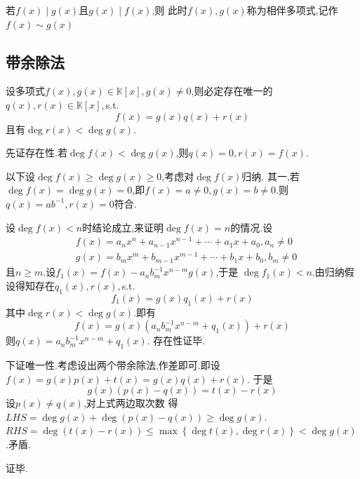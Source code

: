 \begin{formal}
\begin{definition}[相伴多项式]\label{def:相伴多项式}
    若$f\left(x\right)\mid g\left(x\right)$且$g\left(x\right)\mid f\left(x\right)$,则
        此时$f\left(x\right),g\left(x\right)$称为相伴多项式,记作$f\left(x\right)\sim 
        g\left(x\right)$
\end{definition}
\end{formal}
\subsection{带余除法}
\begin{formal}
\begin{theorem}[带余除法]\label{thm:带余除法}
    设多项式$f\left(x\right),g\left(x\right)\in \mathbb{K}\left[x\right],
    g\left(x\right)\neq 0$,则必定存在唯一的$q\left(x\right),r\left(x\right)\in \mathbb{K}\left[x\right]$,\,\textup{s.t.}
    \[
    f\left(x\right)=g\left(x\right)q\left(x\right)+r\left(x\right)
    \]
    且有$\deg r\left(x\right)<\deg g\left(x\right)$.
\end{theorem}
\begin{Proof}
先证存在性.若$\deg f\left(x\right)<\deg g\left(x\right)$,则$q\left(x\right)=0,r\left(x\right)=f\left(x\right)$.

以下设$\deg f\left(x\right)\geqslant \deg g\left(x\right)\geqslant 0$,考虑对$\deg f\left(x\right)$归纳.
其一,若$\deg f\left(x\right)=\deg g\left(x\right)=0$,即$f\left(x\right)=a\neq 0,g\left(x\right)=b\neq 0$.则$q\left(x\right)=ab^{-1},r\left(x\right)=0$符合.

设$\deg f\left(x\right)<n$时结论成立,来证明$\deg f\left(x\right)=n$的情况.设\begin{align*}
    &f\left(x\right)=a_nx^n+a_{n-1}x^{n-1}+\cdots+a_1x+a_0,a_n\neq 0\\
    &g\left(x\right)=b_mx^m+b_{m-1}x^{m-1}+\cdots+b_1x+b_0,b_m\neq 0
\end{align*}
且$n\geqslant m.$设$f_1\left(x\right)=f\left(x\right)-a_nb_m^{-1}x^{n-m}g\left(x\right)$,于是
$\deg f_1\left(x\right)<n.$由归纳假设得知存在$q_1\left(x\right),r\left(x\right)$,\,\textup{s.t.}
\[
f_1\left(x\right)=g\left(x\right)q_1\left(x\right)+r\left(x\right)
\]
其中$\deg r\left(x\right)< \deg g\left(x\right).$即有\[
f\left(x\right)=g\left(x\right)\left(a_nb_m^{-1}x^{n-m}+q_1\left(x\right)\right)+r\left(x\right)
\]
则$q\left(x\right)=a_nb_m^{-1}x^{n-m}+q_1\left(x\right)$.
存在性证毕.

下证唯一性.考虑设出两个带余除法,作差即可.即设$f\left(x\right)=g\left(x\right)p\left(x\right)+t\left(x\right)=g\left(x\right)q\left(x\right)+r\left(x\right)$.
于是\[
g\left(x\right)\left(p\left(x\right)-q\left(x\right)\right)=t\left(x\right)-r\left(x\right)
\]
设$p\left(x\right)\neq q\left(x\right)$,对上式两边取次数
得$LHS = \deg g\left(x\right)+\deg \left(p\left(x\right)-q\left(x\right)\right)\geqslant \deg g\left(x\right)$.
$RHS=\deg\left(t\left(x\right)-r\left(x\right)\right)\leqslant \max\left\{\deg t\left(x\right),\deg r\left(x\right)\right\}<\deg g\left(x\right)$.矛盾.

证毕.
\end{Proof}
\end{formal}
